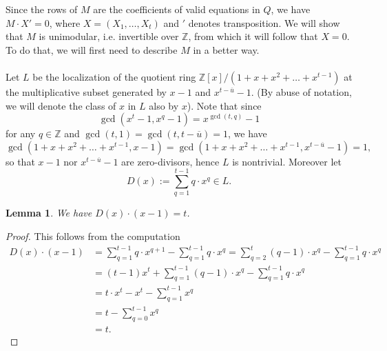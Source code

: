 \documentclass[12pt,a4paper]{article}
\newtheorem{lemma}[theorem]{Lemma}
\newcommand{\Z}{\mathbb{Z}}
\newcommand{\uo}{\overline{u}}
\begin{document}
Since the rows of $M$ are the coefficients of valid equations in $Q$, we have $M\cdot X'=0$, where $X=(X_1,\dots,X_t)$ and $'$ denotes transposition. We will show that $M$ is unimodular, i.e. invertible over $\Z$, from which it will follow that $X=0$. To do that, we will first need to describe $M$ in a better way.

\paragraph*{}
Let $L$ be the localization of the quotient ring $\Z[x]/(1+x+x^2+\dots+x^{t-1})$ at the multiplicative subset generated by $x-1$ and $x^{t-\uo}-1$. (By abuse of notation, we will denote the class of $x$ in $L$ also by $x$). Note that since $$\gcd(x^t-1,x^q-1)=x^{\gcd(t,q)}-1$$ for any $q\in\Z$ and $\gcd(t,1)=\gcd(t,t-\uo)=1$, we have $$\gcd(1+x+x^2+\dots+x^{t-1},x-1)=\gcd(1+x+x^2+\dots+x^{t-1},x^{t-\uo}-1)=1,$$ so that $x-1$ nor $x^{t-\uo}-1$ are zero-divisors, hence $L$ is nontrivial. Moreover let $$D(x):=\sum_{q=1}^{t-1}q\cdot x^q\in L.$$

\begin{lemma}
We have $D(x)\cdot(x-1)=t$.
\end{lemma}
\begin{proof}
This follows from the computation
\begin{equation*}
\begin{split}
D(x)\cdot(x-1)&=\sum_{q=1}^{t-1} q\cdot x^{q+1}-\sum_{q=1}^{t-1} q\cdot x^q=\sum_{q=2}^{t} (q-1)\cdot x^{q}-\sum_{q=1}^{t-1} q\cdot x^q\\
&=(t-1)x^t+\sum_{q=1}^{t-1} (q-1)\cdot x^{q}-\sum_{q=1}^{t-1} q\cdot x^q\\
&=t\cdot x^t-x^t-\sum_{q=1}^{t-1} x^{q}\\
&=t-\sum_{q=0}^{t-1} x^{q}\\
&=t.
\end{split}
\end{equation*}
\end{proof}
\end{document}
